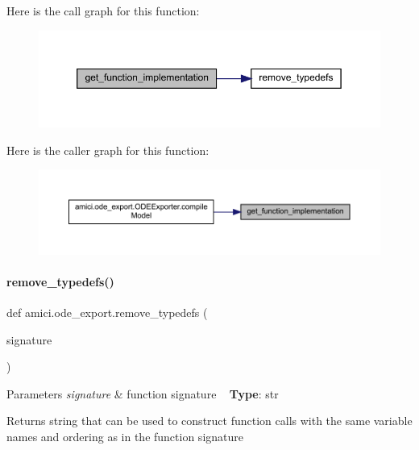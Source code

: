 Here is the call graph for this function\+:
\nopagebreak
\begin{figure}[H]
\begin{center}
\leavevmode
\includegraphics[width=350pt]{namespaceamici_1_1ode__export_a186e3d3705236051c7d43bbd0a91ea08_cgraph}
\end{center}
\end{figure}
Here is the caller graph for this function\+:
\nopagebreak
\begin{figure}[H]
\begin{center}
\leavevmode
\includegraphics[width=350pt]{namespaceamici_1_1ode__export_a186e3d3705236051c7d43bbd0a91ea08_icgraph}
\end{center}
\end{figure}
\mbox{\label{namespaceamici_1_1ode__export_abc24b0bdf0ef2b473259caa60888eeb0}} 
\paragraph{\texorpdfstring{remove\_typedefs()}{remove\_typedefs()}}
{\footnotesize\ttfamily def amici.\+ode\+\_\+export.\+remove\+\_\+typedefs (\begin{DoxyParamCaption}\item[{}]{signature }\end{DoxyParamCaption})}


\begin{DoxyParams}{Parameters}
{\em signature} & function signature ~\newline
{\bfseries{Type}}\+: str\\
\hline
\end{DoxyParams}
\begin{DoxyReturn}{Returns}
string that can be used to construct function calls with the same variable names and ordering as in the function signature 
\end{DoxyReturn}


